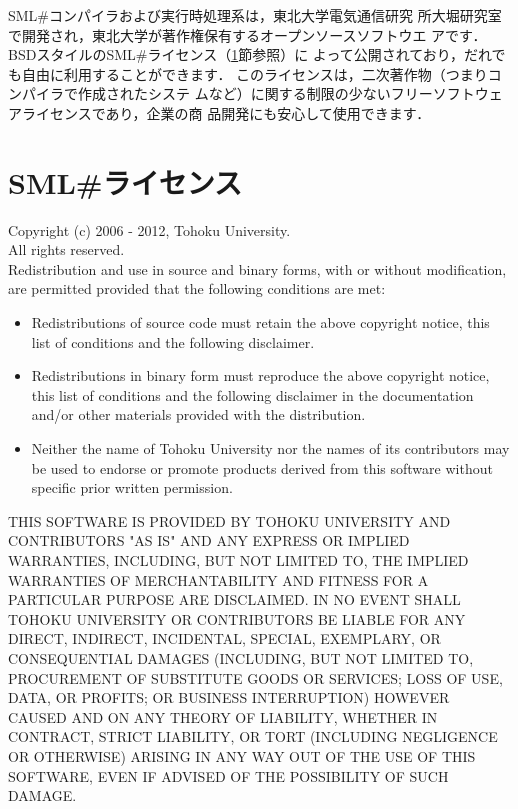 \documentclass{jbook}
\newcommand{\smlsharp}{SML\#}
\begin{document}
	\smlsharp{}コンパイラおよび実行時処理系は，東北大学電気通信研究
所大堀研究室で開発され，東北大学が著作権保有するオープンソースソフトウエ
アです．
	BSDスタイルの\smlsharp{}ライセンス（\ref{sec:smlsharpLicence}節参照）に
よって公開されており，だれでも自由に利用することができます．
	このライセンスは，二次著作物（つまりコンパイラで作成されたシステ
ムなど）に関する制限の少ないフリーソフトウェアライセンスであり，企業の商
品開発にも安心して使用できます．

\section{\smlsharp{}ライセンス}
\label{sec:smlsharpLicence}

Copyright (c) 2006 - 2012, Tohoku University.\\
All rights reserved.\\

Redistribution and use in source and binary forms, with or without
modification, are permitted provided that the following conditions are
met:

\begin{itemize}
\item 
  Redistributions of source code must retain the above copyright
  notice, this list of conditions and the following disclaimer. 
\item 
  Redistributions in binary form must reproduce the above
  copyright notice, this list of conditions and the following disclaimer
  in the documentation and/or other materials provided with the
  distribution. 
\item 
  Neither the name of Tohoku University nor the names of its
  contributors may be used to endorse or promote products derived from
  this software without specific prior written permission.  
\end{itemize}

THIS SOFTWARE IS PROVIDED BY TOHOKU UNIVERSITY AND CONTRIBUTORS "AS IS"
AND ANY EXPRESS OR IMPLIED WARRANTIES, INCLUDING, BUT NOT LIMITED TO,
THE IMPLIED WARRANTIES OF MERCHANTABILITY AND FITNESS FOR A PARTICULAR
PURPOSE ARE DISCLAIMED. IN NO EVENT SHALL TOHOKU UNIVERSITY OR
CONTRIBUTORS BE LIABLE FOR ANY DIRECT, INDIRECT, INCIDENTAL, SPECIAL,
EXEMPLARY, OR CONSEQUENTIAL DAMAGES (INCLUDING, BUT NOT LIMITED TO,
PROCUREMENT OF SUBSTITUTE GOODS OR SERVICES; LOSS OF USE, DATA, OR
PROFITS; OR BUSINESS INTERRUPTION) HOWEVER CAUSED AND ON ANY THEORY OF
LIABILITY, WHETHER IN CONTRACT, STRICT LIABILITY, OR TORT (INCLUDING
NEGLIGENCE OR OTHERWISE) ARISING IN ANY WAY OUT OF THE USE OF THIS
SOFTWARE, EVEN IF ADVISED OF THE POSSIBILITY OF SUCH DAMAGE.
\end{document}
